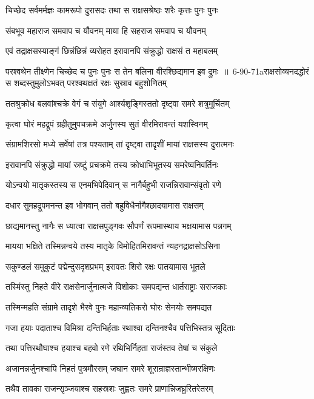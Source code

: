 \twolineshloka
{चिच्छेद सर्वमर्मज्ञः कामरूपो दुरासदः}
{तथा स राक्षसश्रेष्ठः शरैः कृत्तः पुनः पुनः}


\twolineshloka
{संबभूव महाराज समवाप च यौवनम्}
{माया हि सहराज समवाप च यौवनम्}


\twolineshloka
{एवं तद्राक्षसस्याङ्गं छिन्नंछिन्नं व्यरोहत}
{इरावानपि संक्रुद्धो राक्षसं त महाबलम्}


\threelineshloka
{परश्वथेन तीक्ष्णेन चिच्छेद च पुनः पुनः}
{स तेन बलिना वीरश्छिद्यमान इव द्रुमः ॥ 6-90-71aराक्षसोव्यनदद्धोरं स शब्दस्तुमुलोऽभवत्}
{परश्वथक्षतं रक्षः सुस्राव बहुशोणितम्}


\twolineshloka
{ततश्रुक्रोध बलवांश्चक्रे वेगं च संयुगे}
{आर्श्यशृङ्गिस्ततो दृष्ट्वा समरे शत्रुमूर्चितम्}


\twolineshloka
{कृत्वा घोरं महद्रूपं ग्रहीतुमुपचक्रमे}
{अर्जुनस्य सुतं वीरमिरावन्तं यशस्विनम्}


\twolineshloka
{संग्रामशिरसो मध्ये सर्वेषां तत्र पश्यताम्}
{तां दृष्ट्वा तादृशीं मायां राक्षसस्य दुरात्मनः}


\twolineshloka
{इरावानपि संक्रुद्धो मायां स्रष्टुं प्रचक्रमे}
{तस्य क्रोधाभिभूतस्य समरेष्वनिवर्तिनः}


\twolineshloka
{योऽन्वयो मातृकस्तस्य स एनमभिपेदिवान्}
{स नागैर्बहुभी राजन्निरावान्संवृतो रणे}


\twolineshloka
{दधार सुमहद्रूपमनन्त इव भोगवान्}
{ततो बहुविधैर्नागैश्छादयामास राक्षसम्}


\twolineshloka
{छाद्यमानस्तु नागैः स ध्यात्वा राक्षसपुङ्गवः}
{सौपर्णं रूपमास्थाय भक्षयामास पन्नगम्}


\twolineshloka
{मायया भक्षिते तस्मिन्नन्वये तस्य मातृके}
{विमोहितमिरावन्तं न्यहनद्राक्षसोऽसिना}


\twolineshloka
{सकुण्डलं समुकुटं पद्मेन्दुसदृशप्रभम्}
{इरावतः शिरो रक्षः पातयामास भूतले}


\twolineshloka
{तस्मिंस्तु निहते वीरे राक्षसेनार्जुनात्मजे}
{विशोकाः समपद्यन्त धार्तराष्ट्राः सराजकाः}


\twolineshloka
{तस्मिन्महति संग्रामे तादृशे भैरवे पुनः}
{महान्व्यतिकरो घोरः सेनयोः समपद्यत}


\twolineshloka
{गजा हयाः पदाताश्च विमिश्रा दन्तिभिर्हताः}
{रथाश्वा दन्तिनश्चैव पत्तिभिस्तत्र सूदिताः}


\twolineshloka
{तथा पत्तिरथौघाश्च हयाश्च बहवो रणे}
{रथिभिर्निहता राजंस्तव तेषां च संकुले}


\twolineshloka
{अजानन्नर्जुनश्चापि निहतं पुत्रमौरसम्}
{जघान समरे शूरान्राज्ञस्तान्भीष्मरक्षिणः}


\twolineshloka
{तथैव तावका राजन्सृञ्जयाश्च सहस्रशः}
{जुह्वतः समरे प्राणान्निजघ्रुरितरेतरम्}


